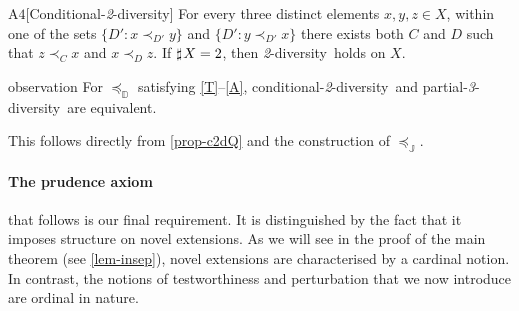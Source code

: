 \documentclass[12pt,a4paper,twoside]{article}
\newcommand{\countof}{\mathbin{\sharp}\hskip1pt}
\newcommand{\mbbd}{{\mathds D}}
\newcommand{\mbbj}{\mathds J}
\newcommand{\parthreediv}{\textup{partial-\textit{3}-diversity}}
\newcommand{\condtwodiv}{\textup{conditional-\textit{2}-diversity}}
\newcommand{\twodiv}{\textit{2}-\textup{diversity}}
\begin{document}
\begin{taggedblank}{\textup{A}$4$}[Conditional-\twodiv]\label{c2d}
  For every three distinct elements $ x , y , z \in X $, within one of the sets
  $ \{ D' : x \prec _{D ' } y \}$ and $ \{ D' : y \prec_{D ' } x \} $ there
  exists  both $C$ and $D$ such that $ z \prec _{ C } x $ and
  $ x \prec _{ D } z $. If $ \countof X = 2 $, then \twodiv\ holds on $X$.

\end{taggedblank}


\begin{theoremEnd}{observation}\label{obs-c2d}
  For $\preceq_{\mbbd}$ satisfying \ref{T}--\ref{A}, \condtwodiv\ and
  \parthreediv\ are equivalent.
\end{theoremEnd}
\begin{proofEnd}\label{proof-obs-c2d}
  This follows directly from \cref{prop-c2dQ} and the construction of
  $\preceq_{\mbbj}$.
\end{proofEnd}
\paragraph{The prudence axiom \hskip-10pt} that follows is our final requirement. It
is distinguished by the fact that it imposes structure on novel extensions. As
we will see in the proof of the main theorem (see \cref{lem-insep}), novel
extensions are characterised by a cardinal notion. In contrast, the notions of
testworthiness and perturbation that we now introduce are ordinal in nature.
\end{document}
